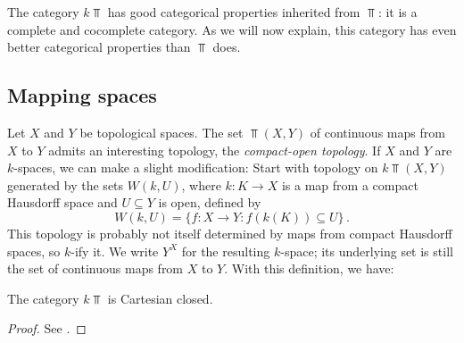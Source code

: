 The category $k\Top$ has good categorical properties inherited from $\Top$:
it is a complete and cocomplete category.
As we will now explain, this category has even better categorical properties
than $\Top$ does.

\subsection{Mapping spaces}\label{mappingspaces}
Let $X$ and $Y$ be topological spaces.
The set $\Top(X,Y)$ of continuous maps from $X$ to $Y$ admits an
interesting topology, the {\em compact-open topology}.
If $X$ and $Y$ are $k$-spaces, we can make a slight modification:
Start with topology on $k\Top(X,Y)$ generated by the sets $W(k,U)$,
where $k:K\to X$ is a map from a compact Hausdorff space and $U\subseteq Y$
is open, defined by
\[
W(k,U) = \{f:X\to Y: f(k(K))\subseteq U\}\,.
\]
This topology is probably not itself determined by maps from compact
Hausdorff spaces, so $k$-ify it. 
We write $Y^X$ for the resulting $k$-space; its underlying
set is still the set of continuous maps from $X$ to $Y$. With this definition,
we have:
\begin{prop}
The category $k\Top$ is Cartesian closed.
\end{prop}
\begin{proof}
See \cite[Proposition 2.11]{StricklandCGWH}.
\end{proof}

